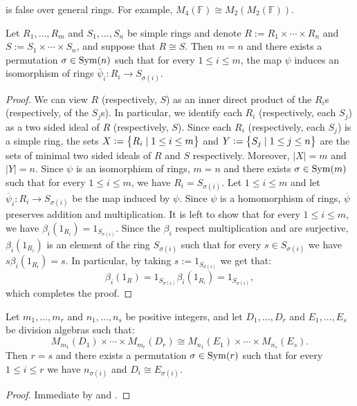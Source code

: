 \documentclass[11pt,a4paper]{article}
\begin{document}
\begin{example}
   is false over
  general rings.
  For example, $M_4(\mathbb F) \cong M_2(M_2(\mathbb F))$.
\end{example}

\begin{lemma}
  \label{lem:unique-factorization-of-product-modules}
  Let $R_1,\dots,R_m$ and $S_1,\dots,S_n$ be simple rings and denote
  $R := R_1 \times \cdots \times R_n$ and $S := S_1 \times \cdots \times S_n$,
  and suppose that $R \cong S$.
  Then $m = n$ and there exists a permutation $\sigma \in \operatorname{Sym}(n)$
  such that for every $1 \le i \le m$,
  the map $\psi$ induces an isomorphism of rings
  $\overline \psi_i \colon R_i \to S_{\sigma(i)}$.
\end{lemma}
\begin{proof}
  We can view $R$ (respectively, $S$) as an inner direct product of the $R_i$s
  (respectively, of the $S_j$s).
  In particular, we identify each $R_i$ (respectively, each $S_j$)
  as a two sided ideal of $R$ (respectively, $S$).
  Since each $R_i$ (respectively, each $S_j$)
  is a simple ring,
  the sets $X := \left\{R_i \mid 1 \le i \le m\right\}$
  and $Y := \left\{S_j \mid 1 \le j \le n\right\}$ are the sets of minimal
  two sided ideals of $R$ and $S$ respectively.
  Moreover, $|X| = m$ and $|Y| = n$.
  Since $\psi$ is an isomorphism of rings, $m = n$ and there exists
  $\sigma \in \operatorname{Sym}(m)$ such that for every $1 \le i \le m$,
  we have $R_i = S_{\sigma(i)}$. %
  Let $1 \le i \le m$ and let $\overline \psi_i \colon R_i \to S_{\sigma(i)}$
  be the map induced by $\psi$.
  Since $\psi$ is a homomorphism of rings, $\overline \psi$ preserves
  addition and multiplication.
  It is left to show that for every $1 \le i \le m$,
  we have $\beta_i(1_{R_i}) = 1_{S_{\sigma(i)}}$.
  Since the $\beta_i$ respect multiplication and are surjective,
  $\beta_i(1_{R_i})$ is an element of the ring $S_{\sigma(i)}$ such that
  for every $s \in S_{\sigma(i)}$ we have $s \beta_i(1_{R_i}) = s$.
  In particular, by taking $s := 1_{S_{\sigma(i)}}$ we get that:
  \[
    \beta_i(1_R) =
    1_{S_{\sigma(i)}} \beta_i(1_{R_i}) =
    1_{S_{\sigma(i)}},
  \]
  which completes the proof.
\end{proof}

\begin{corollary}
  Let $m_1,\dots,m_r$ and $n_1,\dots,n_s$ be positive integers,
  and let $D_1,\dots,D_r$ and $E_1,\dots,E_s$ be division algebras
  such that:
  \[
    M_{m_1}(D_1) \times \cdots \times M_{m_r}(D_r) \cong
    M_{n_1}(E_1) \times \cdots \times M_{n_s}(E_s).
  \]
  Then $r = s$ and there exists a permutation $\sigma \in \operatorname{Sym}(r)$
  such that for every $1 \le i \le r$ we have $n_{\sigma(i)}$
  and $D_i \cong E_{\sigma(i)}$.
\end{corollary}
\begin{proof}
  Immediate by 
  and .
\end{proof}
\end{document}
